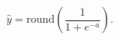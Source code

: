 \begin{equation}
    \hat{y} = \text{round}\!\left(\frac{1}{1+e^{-a}}\right).
    \label{eq:sigmoid}
\end{equation}